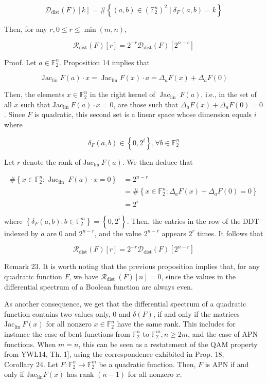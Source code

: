 \documentclass[10pt]{article}
\begin{document}
$$
\mathcal{D}_{\mathrm{dist}}(F)[k]=\#\left\{(a, b) \in\left(\mathbb{F}_{2}^{n}\right)^{2} \mid \delta_{F}(a, b)=k\right\}
$$

Then, for any $r, 0 \leqslant r \leqslant \min (m, n)$,

$$
\mathcal{R}_{\mathrm{dist}}(F)[r]=2^{-r} \mathcal{D}_{\mathrm{dist}}(F)\left[2^{n-r}\right]
$$

Proof. Let $a \in \mathbb{F}_{2}^{n}$. Proposition 14 implies that

$$
\operatorname{Jac}_{\operatorname{lin}} F(a) \cdot x=\operatorname{Jac}_{\operatorname{lin}} F(x) \cdot a=\Delta_{a} F(x)+\Delta_{a} F(0)
$$

Then, the elements $x \in \mathbb{F}_{2}^{n}$ in the right kernel of $\operatorname{Jac}_{\text {lin }} F(a)$, i.e., in the set of all $x$ such that $\mathrm{Jac}_{\text {lin }} F(a) \cdot x=0$, are those such that $\Delta_{a} F(x)+\Delta_{a} F(0)=0$. Since $F$ is quadratic, this second set is a linear space whose dimension equals $i$ where

$$
\delta_{F}(a, b) \in\left\{0,2^{i}\right\}, \forall b \in \mathbb{F}_{2}^{n}
$$

Let $r$ denote the rank of $\mathrm{Jac}_{\text {lin }} F(a)$. We then deduce that

$$
\begin{aligned}
\#\left\{x \in \mathbb{F}_{2}^{n}: \operatorname{Jac}_{\text {lin }} F(a) \cdot x=0\right\} & =2^{n-r} \\
& =\#\left\{x \in \mathbb{F}_{2}^{n}: \Delta_{a} F(x)+\Delta_{a} F(0)=0\right\} \\
& =2^{i}
\end{aligned}
$$

where $\left\{\delta_{F}(a, b): b \in \mathbb{F}_{2}^{m}\right\}=\left\{0,2^{i}\right\}$. Then, the entries in the row of the DDT indexed by $a$ are 0 and $2^{n-r}$, and the value $2^{n-r}$ appears $2^{r}$ times. It follows that

$$
\mathcal{R}_{\mathrm{dist}}(F)[r]=2^{-r} \mathcal{D}_{\mathrm{dist}}(F)\left[2^{n-r}\right]
$$

Remark 23. It is worth noting that the previous proposition implies that, for any quadratic function $F$, we have $\mathcal{R}_{\text {dist }}(F)[n]=0$, since the values in the differential spectrum of a Boolean function are always even.

As another consequence, we get that the differential spectrum of a quadratic function contains two values only, 0 and $\delta(F)$, if and only if the matrices $\mathrm{Jac}_{\text {lin }} F(x)$ for all nonzero $x \in \mathbb{F}_{2}^{n}$ have the same rank. This includes for instance the case of bent functions from $\mathbb{F}_{2}^{n}$ to $\mathbb{F}_{2}^{m}, n \geqslant 2 m$, and the case of APN functions. When $m=n$, this can be seen as a restatement of the QAM property from YWL14, Th. 1], using the correspondence exhibited in Prop. 18,\\
Corollary 24. Let $F: \mathbb{F}_{2}^{n} \rightarrow \mathbb{F}_{2}^{m}$ be a quadratic function. Then, $F$ is APN if and only if $\mathrm{Jac}_{\operatorname{lin}} F(x)$ has rank $(n-1)$ for all nonzero $x$.
\end{document}
